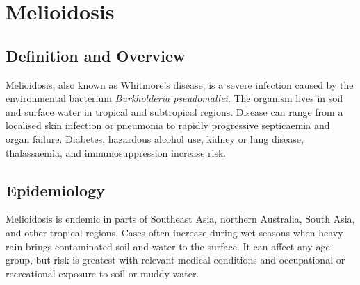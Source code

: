 \chapter{Melioidosis}

\section*{Definition and Overview}
Melioidosis, also known as Whitmore's disease, is a severe infection caused by the environmental bacterium \textit{Burkholderia pseudomallei}. The organism lives in soil and surface water in tropical and subtropical regions. Disease can range from a localised skin infection or pneumonia to rapidly progressive septicaemia and organ failure. Diabetes, hazardous alcohol use, kidney or lung disease, thalassaemia, and immunosuppression increase risk.

\section*{Epidemiology}
Melioidosis is endemic in parts of Southeast Asia, northern Australia, South Asia, and other tropical regions. Cases often increase during wet seasons when heavy rain brings contaminated soil and water to the surface. It can affect any age group, but risk is greatest with relevant medical conditions and occupational or recreational exposure to soil or muddy water.

